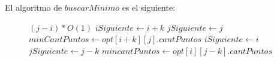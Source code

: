 El algoritmo de $buscarMinimo$ es el siguiente:

\begin{center}
 \begin{figure}[H]
  \begin{pseudo}
     \hfill $(j-i)*O(1)$
	\State $iSiguiente \leftarrow i+k$
	\State $jSiguiente \leftarrow j$
	\State $minCantPuntos \leftarrow opt[i+k][j].cantPuntos$
      \EndIf
	\State $iSiguiente \leftarrow i$
	\State $jSiguiente \leftarrow j-k$
	\State $mincantPuntos \leftarrow opt[i][j-k].cantPuntos$
      \EndIf
    \EndFor
   \EndProcedure
  \end{pseudo}
  \label{problema1-pseudo2}
 \end{figure}

\end{center}